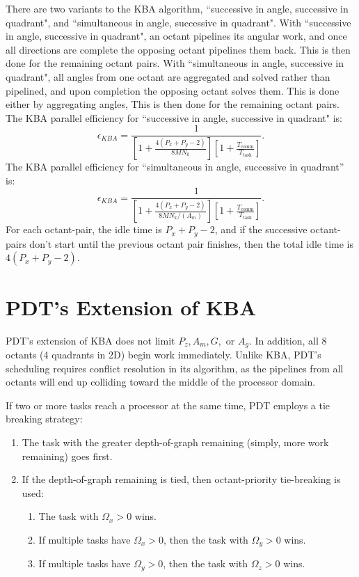 There are two variants to the KBA algorithm, ``successive in angle, successive in quadrant", and ``simultaneous in angle, successive in quadrant".  With ``successive in angle, successive in quadrant", an octant pipelines its angular work, and once all directions are complete the opposing octant pipelines them back. This is then done for the remaining octant pairs. With ``simultaneous in angle, successive in quadrant", all angles from one octant are aggregated and solved rather than pipelined, and upon completion the opposing octant solves them. This is done either by aggregating angles, This is then done for the remaining octant pairs. The KBA parallel efficiency \cite{mpadams2013} for ``successive in angle, successive in quadrant" is:
\begin{equation}
  \epsilon_{KBA} = \frac{1}{[1 + \frac{4(P_x+P_y-2)}{8MN_k}][1 + \frac{T_{\text{comm}}}{T_{\text{{task}}}}]}.
  \label{eps_kba}
\end{equation}
The KBA parallel efficiency for ``simultaneous in angle, successive in quadrant'' is:
\begin{equation}
   \epsilon_{KBA} = \frac{1}{[1 + \frac{4(P_x+P_y-2)}{8MN_k/(A_m)}][1 + \frac{T_{\text{comm}}}{T_{\text{{task}}}}]}.
   \label{eps_kba_simul}
\end{equation}
For each octant-pair, the idle time is $P_x + P_y - 2$, and if the successive octant-pairs don't start until the previous octant pair finishes, then the total idle time is $4(P_x + P_y - 2)$. 

\section{PDT's Extension of KBA}\label {pdt_extension}

PDT's extension of KBA does not limit $P_z, A_m, G,$ or $A_g$. In addition, all 8 octants (4 quadrants in 2D) begin work immediately. Unlike KBA, PDT's scheduling requires conflict resolution in its algorithm, as the pipelines from all octants will end up colliding toward the middle of the processor domain.

If two or more tasks reach a processor at the same time, PDT employs a tie breaking strategy:

\begin{enumerate}
	\item The task with the greater depth-of-graph remaining (simply, more work remaining) goes first.
	\item If the depth-of-graph remaining is tied, then octant-priority tie-breaking is used:
	\begin{enumerate}
	  \item The task with $\Omega_x > 0$ wins.
	  \item If multiple tasks have $\Omega_x > 0$, then the task with $\Omega_y > 0$ wins.
	  \item If multiple tasks have $\Omega_y > 0$, then the task with $\Omega_z > 0$ wins.
	\end{enumerate}
\end{enumerate}

